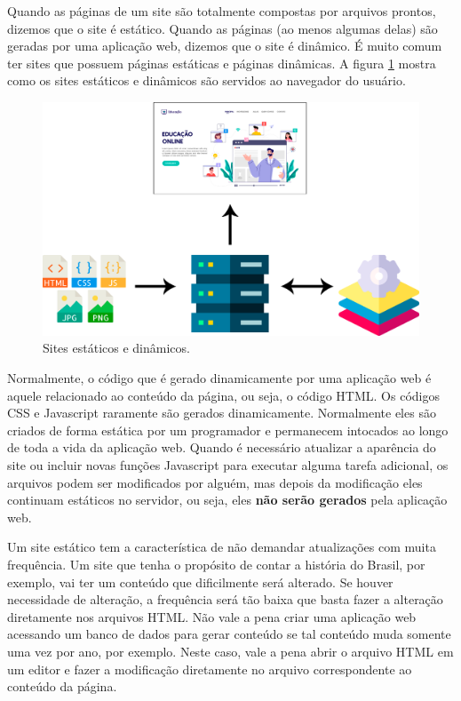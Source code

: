 Quando as páginas de um site são totalmente compostas por arquivos prontos, dizemos que o site é estático. Quando as páginas (ao menos algumas delas) são geradas por uma aplicação web, dizemos que o site é dinâmico. É muito comum ter sites que possuem páginas estáticas e páginas dinâmicas. A figura \ref{fig:sitesestdyn} mostra como os sites estáticos e dinâmicos são servidos ao navegador do usuário.

\begin{figure}[htbp!]
    \centering
    \includegraphics[width=1\textwidth]{Images/chapter01/site_est_dyn.png}
    \caption{Sites estáticos e dinâmicos.}
    \label{fig:sitesestdyn}
\end{figure}

Normalmente, o código que é gerado dinamicamente por uma aplicação web é aquele relacionado ao conteúdo da página, ou seja, o código HTML. Os códigos CSS e Javascript raramente são gerados dinamicamente. Normalmente eles são criados de forma estática por um programador e permanecem intocados ao longo de toda a vida da aplicação web. Quando é necessário atualizar a aparência do site ou incluir novas funções Javascript para executar alguma tarefa adicional, os arquivos podem ser modificados por alguém, mas depois da modificação eles continuam estáticos no servidor, ou seja, eles \textbf{não serão gerados} pela aplicação web.

Um site estático tem a característica de não demandar atualizações com muita frequência. Um site que tenha o propósito de contar a história do Brasil, por exemplo, vai ter um conteúdo que dificilmente será alterado. Se houver necessidade de alteração, a frequência será tão baixa que basta fazer a alteração diretamente nos arquivos HTML. Não vale a pena criar uma aplicação web acessando um banco de dados para gerar conteúdo se tal conteúdo muda somente uma vez por ano, por exemplo. Neste caso, vale a pena abrir o arquivo HTML em um editor e fazer a modificação diretamente no arquivo correspondente ao conteúdo da página. 

